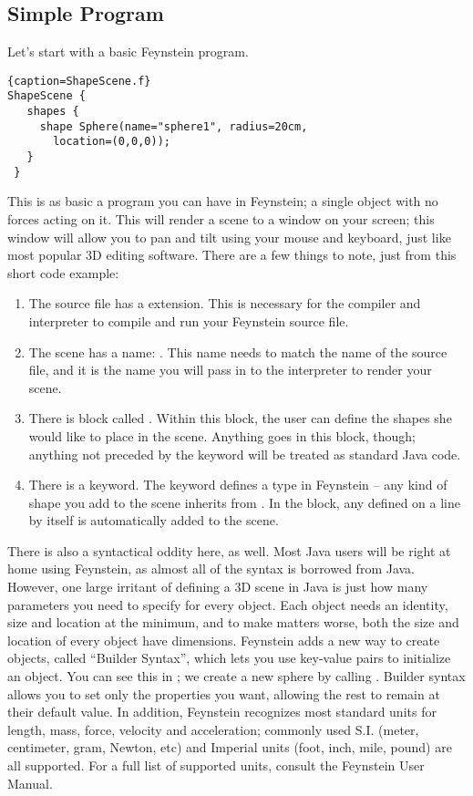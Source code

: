 \subsection{Simple Program}

Let's start with a basic Feynstein program.

\begin{lstlisting}{caption=ShapeScene.f}
ShapeScene {
   shapes {
     shape Sphere(name="sphere1", radius=20cm, 
       location=(0,0,0));
   }
 }
\end{lstlisting}

This is as basic a program you can have in Feynstein; a single object
with no forces acting on it. This will render a scene to a window on
your screen; this window will allow you to pan and tilt using your
mouse and keyboard, just like most popular 3D editing software. There
are a few things to note, just from this short code example:

\begin{enumerate}
\item The source file has a  extension. This is necessary
  for the compiler and interpreter to compile and run your Feynstein
  source file.
\item The scene has a name: . This name needs
  to match the name of the source file, and it is the name you will
  pass in to the interpreter to render your scene.
\item There is block called . Within this block, the user can
  define the shapes she would like to place in the scene. Anything
  goes in this block, though; anything not preceded by the 
  keyword will be treated as standard Java code.
\item There is a  keyword. The  keyword
  defines a type in Feynstein -- any kind of shape you add to the
  scene inherits from . In the  block, any
   defined on a line by itself is automatically added to
  the scene.
\end{enumerate}

There is also a syntactical oddity here, as well. Most Java users will
be right at home using Feynstein, as almost all of the syntax is
borrowed from Java. However, one large irritant of defining a 3D scene
in Java is just how many parameters you need to specify for every
object. Each object needs an identity, size and location at the
minimum, and to make matters worse, both the size and location of
every object have dimensions. Feynstein adds a new way to create
objects, called “Builder Syntax”, which lets you use key-value pairs
to initialize an object. You can see this in ; we
create a new sphere by calling . Builder syntax allows you to set
only the properties you want, allowing the rest to remain at their
default value. In addition, Feynstein recognizes most standard units
for length, mass, force, velocity and acceleration; commonly used
S.I. (meter, centimeter, gram, Newton, etc) and Imperial units (foot,
inch, mile, pound) are all supported. For a full list of supported
units, consult the Feynstein User Manual.


